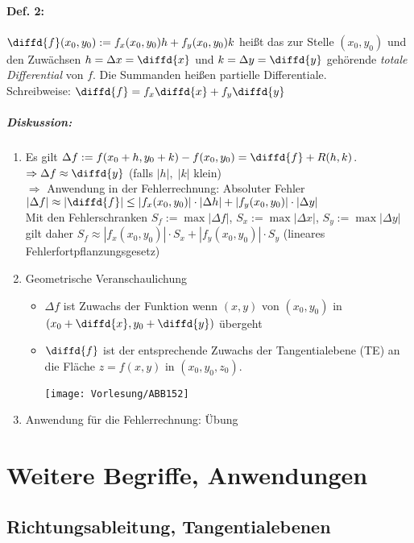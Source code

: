 \paragraph{Def. 2:} $\diffd{f}(x_0,y_0):=f_x(x_0,y_0)h+f_y(x_0,y_0)k$ heißt das zur Stelle $(x_0,y_0)$ und den Zuwächsen $h=\Delta x = \diffd{x}$ und $k=\Delta y = \diffd{y}$ gehörende \emph{totale Differential} von $f$. Die Summanden heißen partielle Differentiale.\\
Schreibweise: $\diffd{f}=f_x \diffd{x}+f_y\diffd{y}$
\subparagraph{Diskussion:} 
\begin{enumerate}
\item Es gilt $\Delta f := f(x_0+h, y_0+k) - f(x_0,y_0) = \diffd{f}+R(h,k)$.\\
$\Rightarrow \Delta f \approx \diffd{y}$ (falls $|h|, \; |k|$ klein)\\
$\Rightarrow$ Anwendung in der Fehlerrechnung: Absoluter Fehler\\
$|\Delta f| \approx | \diffd{f}| \leq |f_x(x_0,y_0)| \cdot |\Delta h| + |f_y(x_0,y_0)|\cdot |\Delta y|$\\
Mit den Fehlerschranken $S_f:=\max|\Delta f|$, $S_x:=\max|\Delta x|$, $S_y:=\max|\Delta y|$ gilt daher $S_f\approx |f_x(x_0,y_0)| \cdot  S_x + |f_y(x_0,y_0)| \cdot  S_y$ (lineares Fehlerfortpflanzungsgesetz)
\item Geometrische Veranschaulichung
\begin{itemize}
\item $\Delta f$ ist Zuwachs der Funktion wenn $(x,y)$ von $(x_0,y_0)$ in $(x_0+\diffd{x}, y_0 + \diffd{y})$ übergeht
\item $\diffd{f}$ ist der entsprechende Zuwachs der Tangentialebene (TE) an die Fläche $z=f(x,y)$ in $(x_0,y_0, z_0)$.
\begin{center}
\texttt{[image: Vorlesung/ABB152]}
\end{center}
\end{itemize}
\item Anwendung für die Fehlerrechnung: Übung
\end{enumerate}

\section{Weitere Begriffe, Anwendungen}
\subsection{Richtungsableitung, Tangentialebenen}
